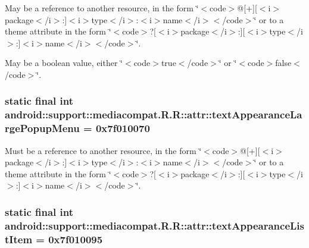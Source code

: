 May be a reference to another resource, in the form \char`\"{}$<$code$>$@\mbox{[}+\mbox{]}\mbox{[}$<$i$>$package$<$/i$>$:\mbox{]}$<$i$>$type$<$/i$>$:$<$i$>$name$<$/i$>$$<$/code$>$\char`\"{} or to a theme attribute in the form \char`\"{}$<$code$>$?\mbox{[}$<$i$>$package$<$/i$>$:\mbox{]}\mbox{[}$<$i$>$type$<$/i$>$:\mbox{]}$<$i$>$name$<$/i$>$$<$/code$>$\char`\"{}. 

May be a boolean value, either \char`\"{}$<$code$>$true$<$/code$>$\char`\"{} or \char`\"{}$<$code$>$false$<$/code$>$\char`\"{}. \hypertarget{classandroid_1_1support_1_1mediacompat_1_1_r_1_1attr_2ffc897f2992f61d2d1596d2ef531311}{
\subsubsection[{textAppearanceLargePopupMenu}]{\setlength{\rightskip}{0pt plus 5cm}static final int android::support::mediacompat.R.R::attr::textAppearanceLargePopupMenu = 0x7f010070}}
\label{classandroid_1_1support_1_1mediacompat_1_1_r_1_1attr_2ffc897f2992f61d2d1596d2ef531311}


Must be a reference to another resource, in the form \char`\"{}$<$code$>$@\mbox{[}+\mbox{]}\mbox{[}$<$i$>$package$<$/i$>$:\mbox{]}$<$i$>$type$<$/i$>$:$<$i$>$name$<$/i$>$$<$/code$>$\char`\"{} or to a theme attribute in the form \char`\"{}$<$code$>$?\mbox{[}$<$i$>$package$<$/i$>$:\mbox{]}\mbox{[}$<$i$>$type$<$/i$>$:\mbox{]}$<$i$>$name$<$/i$>$$<$/code$>$\char`\"{}. \hypertarget{classandroid_1_1support_1_1mediacompat_1_1_r_1_1attr_0c57f42b27d136875f1d3c8e94d0297c}{
\subsubsection[{textAppearanceListItem}]{\setlength{\rightskip}{0pt plus 5cm}static final int android::support::mediacompat.R.R::attr::textAppearanceListItem = 0x7f010095}}
\label{classandroid_1_1support_1_1mediacompat_1_1_r_1_1attr_0c57f42b27d136875f1d3c8e94d0297c}


